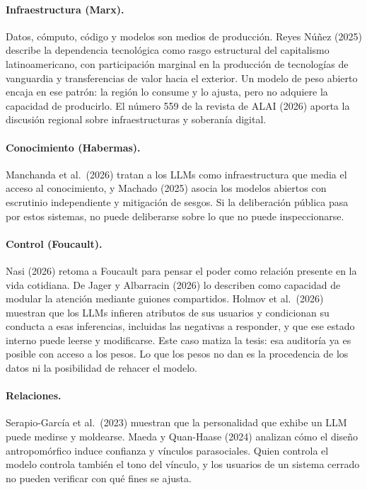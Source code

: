 \documentclass[11pt]{article}
\begin{document}
\paragraph{Infraestructura (Marx).} Datos, cómputo, código y modelos son medios de producción. Reyes Núñez (2025) describe la dependencia tecnológica como rasgo estructural del capitalismo latinoamericano, con participación marginal en la producción de tecnologías de vanguardia y transferencias de valor hacia el exterior. Un modelo de peso abierto encaja en ese patrón: la región lo consume y lo ajusta, pero no adquiere la capacidad de producirlo. El número 559 de la revista de ALAI (2026) aporta la discusión regional sobre infraestructuras y soberanía digital.

\paragraph{Conocimiento (Habermas).} Manchanda et al.\ (2026) tratan a los LLMs como infraestructura que media el acceso al conocimiento, y Machado (2025) asocia los modelos abiertos con escrutinio independiente y mitigación de sesgos. Si la deliberación pública pasa por estos sistemas, no puede deliberarse sobre lo que no puede inspeccionarse.

\paragraph{Control (Foucault).} Nasi (2026) retoma a Foucault para pensar el poder como relación presente en la vida cotidiana. De Jager y Albarracin (2026) lo describen como capacidad de modular la atención mediante guiones compartidos. Holmov et al.\ (2026) muestran que los LLMs infieren atributos de sus usuarios y condicionan su conducta a esas inferencias, incluidas las negativas a responder, y que ese estado interno puede leerse y modificarse. Este caso matiza la tesis: esa auditoría ya es posible con acceso a los pesos. Lo que los pesos no dan es la procedencia de los datos ni la posibilidad de rehacer el modelo.

\paragraph{Relaciones.} Serapio-García et al.\ (2023) muestran que la personalidad que exhibe un LLM puede medirse y moldearse. Maeda y Quan-Haase (2024) analizan cómo el diseño antropomórfico induce confianza y vínculos parasociales. Quien controla el modelo controla también el tono del vínculo, y los usuarios de un sistema cerrado no pueden verificar con qué fines se ajusta.
\end{document}
